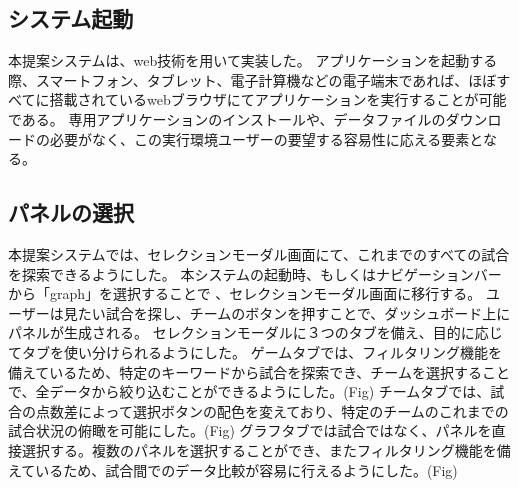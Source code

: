 \documentclass[sotsuron]{kuee}
\begin{document}
		\subsection{システム起動}
			本提案システムは、web技術を用いて実装した。
			アプリケーションを起動する際、スマートフォン、タブレット、電子計算機などの電子端末であれば、ほぼすべてに搭載されているwebブラウザにてアプリケーションを実行することが可能である。
			専用アプリケーションのインストールや、データファイルのダウンロードの必要がなく、この実行環境ユーザーの要望する容易性に応える要素となる。
		\subsection{パネルの選択}
			本提案システムでは、セレクションモーダル画面にて、これまでのすべての試合を探索できるようにした。
			本システムの起動時、もしくはナビゲーションバーから「graph」を選択することで	、セレクションモーダル画面に移行する。
			ユーザーは見たい試合を探し、チームのボタンを押すことで、ダッシュボード上にパネルが生成される。
			セレクションモーダルに３つのタブを備え、目的に応じてタブを使い分けられるようにした。
			ゲームタブでは、フィルタリング機能を備えているため、特定のキーワードから試合を探索でき、チームを選択することで、全データから絞り込むことができるようにした。(Fig)
			チームタブでは、試合の点数差によって選択ボタンの配色を変えており、特定のチームのこれまでの試合状況の俯瞰を可能にした。(Fig)
			グラフタブでは試合ではなく、パネルを直接選択する。複数のパネルを選択することができ、またフィルタリング機能を備えているため、試合間でのデータ比較が容易に行えるようにした。(Fig)
\end{document}
